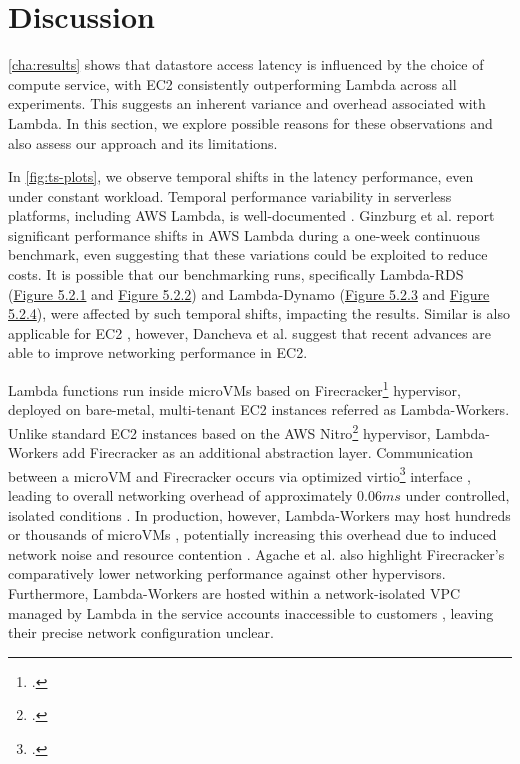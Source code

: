 \section{Discussion}
\label{cha:discuss}

\cref{cha:results} shows that datastore access latency is influenced by the choice of compute service, with EC2 consistently outperforming Lambda across all experiments. This suggests an inherent variance and overhead associated with Lambda. In this section, we explore possible reasons for these observations and also assess our approach and its limitations.

In \cref{fig:ts-plots}, we observe temporal shifts in the latency performance, even under constant workload. Temporal performance variability in serverless platforms, including AWS Lambda, is well-documented \cite{paper_ginzburg_lambda_var,article_eismann_lambda_var,paper_schirmer_night_shift}. Ginzburg et al. \cite{paper_ginzburg_lambda_var} report significant performance shifts in AWS Lambda during a one-week continuous benchmark, even suggesting that these variations could be exploited to reduce costs. It is possible that our benchmarking runs, specifically Lambda-RDS (\hyperref[fig:bar_rds_const]{Figure 5.2.1} and \hyperref[fig:bar_rds_bursty]{Figure 5.2.2}) and Lambda-Dynamo (\hyperref[fig:bar_ddb_const]{Figure 5.2.3} and \hyperref[fig:bar_ddb_bursty]{Figure 5.2.4}), were affected by such temporal shifts, impacting the results. Similar is also applicable for EC2 \cite{paper_iosup_performance,article_schad_cloud_var}, however, Dancheva et al. \cite{article_dancheva_ec2_var} suggest that recent advances are able to improve networking performance in EC2.

Lambda functions run inside microVMs based on Firecracker\footcite{https://firecracker-microvm.github.io/} hypervisor, deployed on bare-metal, multi-tenant EC2 instances referred as Lambda-Workers. Unlike standard EC2 instances based on the AWS Nitro\footcite{https://aws.amazon.com/ec2/nitro/} hypervisor, Lambda-Workers add Firecracker as an additional abstraction layer. Communication between a microVM and Firecracker occurs via optimized virtio\footcite{https://libvirt.org/} interface \cite{paper_brooker_lambda}, leading to overall networking overhead of approximately $0.06ms$ under controlled, isolated conditions \cite{repo_aws_firecracker}. In production, however, Lambda-Workers may host hundreds or thousands of microVMs \cite{paper_agache_firecracker}, potentially increasing this overhead due to induced network noise and resource contention \cite{}. Agache et al. \cite{paper_agache_firecracker} also highlight Firecracker's comparatively lower networking performance against other hypervisors. Furthermore, Lambda-Workers are hosted within a network-isolated VPC managed by Lambda in the service accounts inaccessible to customers \cite{web_aws_lambda_security}, leaving their precise network configuration unclear.

